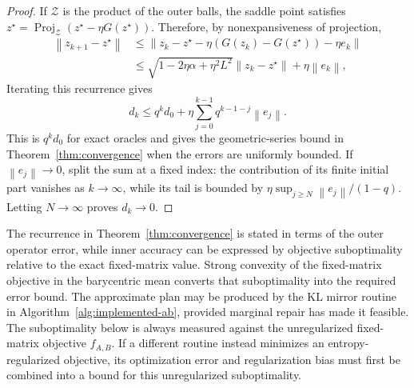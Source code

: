 \documentclass[11pt]{article}
\newcommand{\norm}[1]{\left\lVert #1\right\rVert}
\theoremstyle{plain}
\theoremstyle{definition}
\theoremstyle{remark}
\begin{document}
\begin{proof}
If $\mathcal Z$ is the product of the
outer balls, the saddle point satisfies
$z^\star=\operatorname{Proj}_{\mathcal Z}(z^\star-\eta G(z^\star))$. Therefore,
by nonexpansiveness of projection,
\[
\begin{aligned}
 \norm{z_{k+1}-z^\star}
 &\le\norm{z_k-z^\star-\eta(G(z_k)-G(z^\star))-\eta e_k}\\
 &\le\sqrt{1-2\eta\alpha+\eta^2L^2}\norm{z_k-z^\star}
   +\eta\norm{e_k},
\end{aligned}
\]
Iterating this recurrence gives
\[
 d_k\le q^k d_0+
 \eta\sum_{j=0}^{k-1}q^{k-1-j}\norm{e_j}.
\]
This is \(q^kd_0\) for exact oracles and gives the geometric-series bound in
Theorem~\ref{thm:convergence} when the errors are uniformly bounded. If
\(\norm{e_j}\to0\), split the
sum at a fixed index: the contribution of its finite initial part vanishes as
\(k\to\infty\), while its tail is bounded by
\(\eta\sup_{j\ge N}\norm{e_j}/(1-q)\). Letting \(N\to\infty\) proves
\(d_k\to0\).
\end{proof}

The recurrence in Theorem~\ref{thm:convergence} is stated in terms of the outer
operator error, while inner accuracy can be expressed by objective suboptimality
relative to the exact fixed-matrix value. Strong convexity of the fixed-matrix
objective in the barycentric mean converts that suboptimality into the required
error bound. The approximate plan may be produced by the KL mirror
routine in Algorithm~\ref{alg:implemented-ab}, provided marginal repair has made
it feasible. The suboptimality below is always measured against the unregularized
fixed-matrix objective \(f_{A,B}\). If a different routine instead minimizes an
entropy-regularized objective, its optimization error and regularization bias must
first be combined into a bound for this unregularized suboptimality.
\end{document}
